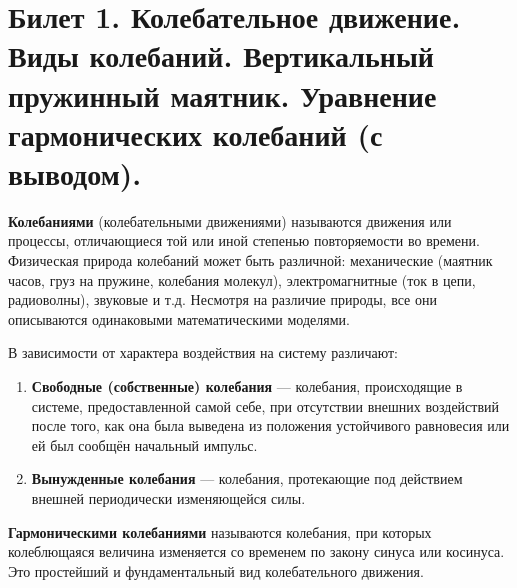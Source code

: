 \section{Билет 1. Колебательное движение. Виды колебаний. Вертикальный пружинный маятник. Уравнение гармонических колебаний (с выводом).}

\begin{definition}
\textbf{Колебаниями} (колебательными движениями) называются движения или процессы, отличающиеся той или иной степенью повторяемости во времени. 
Физическая природа колебаний может быть различной: механические (маятник часов, груз на пружине, колебания молекул), электромагнитные (ток в цепи, радиоволны), звуковые и т.д. Несмотря на различие природы, все они описываются одинаковыми математическими моделями.
\end{definition}

\begin{definition}
В зависимости от характера воздействия на систему различают:
\begin{enumerate}
    \item \textbf{Свободные (собственные) колебания} --- колебания, происходящие в системе, предоставленной самой себе, при отсутствии внешних воздействий после того, как она была выведена из положения устойчивого равновесия или ей был сообщён начальный импульс.
    \item \textbf{Вынужденные колебания} --- колебания, протекающие под действием внешней периодически изменяющейся силы.
\end{enumerate}
\end{definition}

\begin{definition}
\textbf{Гармоническими колебаниями} называются колебания, при которых колеблющаяся величина изменяется со временем по закону синуса или косинуса. Это простейший и фундаментальный вид колебательного движения.
\end{definition}


